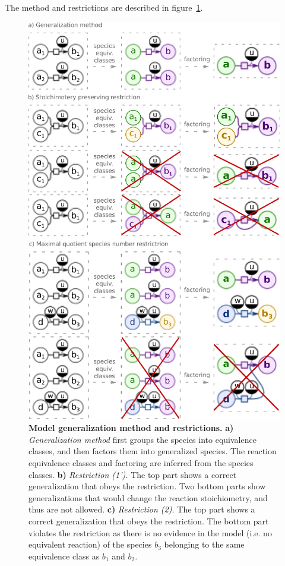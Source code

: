 \documentclass[9pt]{article}
\newcounter{fig}
\begin{document}
The method and restrictions are described in figure~\ref{fig:mg}.

\begin{figure}[th]
\centering
\includegraphics{Zhukova_Fig_1.eps}
\caption{\textbf{Model generalization method and restrictions.} 
\textbf{a)} \textit{Generalization method} first groups the species into equivalence classes, and then factors them into generalized species. The reaction equivalence classes and factoring are inferred from the species classes.
\textbf{b)} \textit{Restriction (1').} The top part shows a correct generalization that obeys the restriction. Two bottom parts show generalizations that would change the reaction stoichiometry, and thus are not allowed.
\textbf{c)} \textit{Restriction (2).} The top part shows a correct generalization that obeys the restriction. The bottom part violates the restriction as there is no evidence in the model (i.e. no equivalent reaction) of the species $b_3$ belonging to the same equivalence class as $b_1$ and $b_2$.}
\label{fig:mg}
\end{figure}
\end{document}
